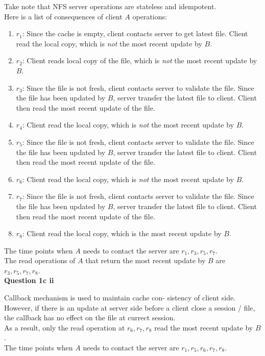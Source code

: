 \documentclass[11pt,a4paper]{report}
\begin{document}
\begin{multicols*}{2}
\noindent Take note that NFS server operations are stateless and idempotent.\\

\noindent Here is a list of consequences of client $A$ operations:
\begin{enumerate}
  \item $r_1$: Since the cache is empty, client contacts server to get latest file. Client read the local copy, which is \emph{not} the most recent update by $B$.
  \item $r_2$: Client reads local copy of the file, which is \emph{not} the most recent update by $B$.
  \item $r_3$: Since the file is not fresh, client contacts server to validate the file. Since the file has been updated by $B$, server transfer the latest file to client. Client then read the most recent update of the file. 
  \item $r_4$: Client read the local copy, which is \emph{not} the most recent update by $B$.
  \item $r_5$: Since the file is not fresh, client contacts server to validate the file. Since the file has been updated by $B$, server transfer the latest file to client. Client then read the most recent update of the file. 
  \item $r_6$: Client read the local copy, which is \emph{not} the most recent update by $B$.
  \item $r_7$: Since the file is not fresh, client contacts server to validate the file. Since the file has been updated by $B$, server transfer the latest file to client. Client then read the most recent update of the file. 
  \item $r_8$: Client read the local copy, which is the most recent update by $B$.
\end{enumerate}

\noindent The time points when $A$ needs to contact the server are $r_1,r_3,r_5,r_7$.\\

\noindent The read operations of $A$ that return the most recent update by $B$ are $r_3,r_5,r_7,r_8$. \\

\noindent \textbf{Question 1c ii}

\noindent Callback mechanism is used to maintain cache con- sistency of client side. However, if there is an update at server side before a client close a session / file, the callback has no effect on the file at currect session. \\

\noindent As a result, only the read operation at $r_6,r_7,r_8$ read the most recent update by $B$. \\

\noindent The time points when $A$ needs to contact the server are $r_1,r_5,r_6,r_7,r_8$.\\

\end{multicols*}
\end{document}
